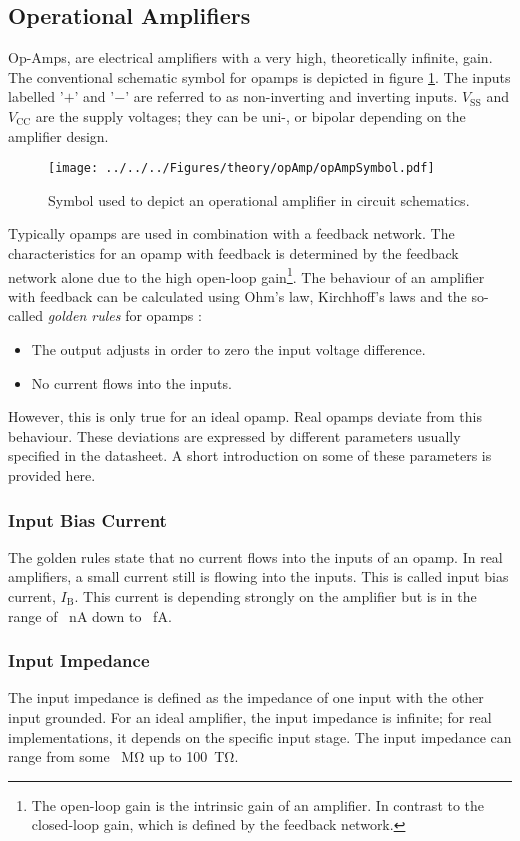 \subsection{Operational Amplifiers}
\label{sec:theory:amplifiers}
Op-Amps, are electrical amplifiers with a very high, theoretically infinite, gain. The conventional schematic symbol for \acp{opamp} is depicted in figure \ref{fig:theory:opAmp}. The inputs labelled '$+$' and '$-$' are referred to as non-inverting and inverting inputs. $V_\text{SS}$ and $V_\text{CC}$ are the supply voltages; they can be uni-, or bipolar depending on the amplifier design. 
\begin{figure}
	\centering
	\texttt{[image: ../../../Figures/theory/opAmp/opAmpSymbol.pdf]}
	\caption{Symbol used to depict an operational amplifier in circuit schematics.}
	\label{fig:theory:opAmp}
\end{figure}
Typically \acp{opamp} are used in combination with a feedback network. The characteristics for an \ac{opamp} with feedback is determined by the feedback network alone due to the high open-loop gain\footnote{The open-loop gain is the intrinsic gain of an amplifier. In contrast to the closed-loop gain, which is defined by the feedback network.}. The behaviour of an amplifier with feedback can be calculated using Ohm's law, Kirchhoff's laws and the so-called \textit{golden rules} for \acp{opamp} \cite{art}:
\begin{itemize}
	\item The output adjusts in order to zero the input voltage difference.
	\item No current flows into the inputs.
\end{itemize} 
However, this is only true for an ideal \ac{opamp}. Real \acp{opamp} deviate from this behaviour. These deviations are expressed by different parameters usually specified in the datasheet.
A short introduction on some of these parameters is provided here.
\subsubsection*{Input Bias Current}
The golden rules state that no current flows into the inputs of an \ac{opamp}. In real amplifiers, a small current still is flowing into the inputs. This is called input bias current, $I_\text{B}$. This current is depending strongly on the amplifier but is in the range of \SI{}{\nano\ampere} down to \SI{}{\femto\ampere}. 
\subsubsection*{Input Impedance}
The input impedance is defined as the impedance of one input with the other input grounded. For an ideal amplifier, the input impedance is infinite; for real implementations, it depends on the specific input stage. The input impedance can range from some \SI{}{\mega\ohm} up to \SI{100}{\tera\ohm}.
